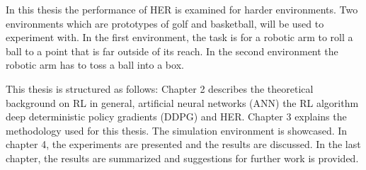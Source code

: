 In this thesis the performance of HER is examined for harder environments. Two environments which are prototypes of golf and basketball, will be used to experiment with. In the first environment, the task is for a robotic arm to roll a ball to a point that is far outside of its reach. In the second environment the robotic arm has to toss a ball into a box.  

\vspace{0.5cm}

This thesis is structured as follows: 
Chapter 2 describes the theoretical background on RL in general, artificial neural networks (ANN) the RL algorithm deep deterministic policy gradients (DDPG) and HER. 
Chapter 3 explains the methodology used for this thesis. The simulation environment is showcased.
In chapter 4, the experiments are presented and the results are discussed.
In the last chapter, the results are summarized and suggestions for further work is provided.




